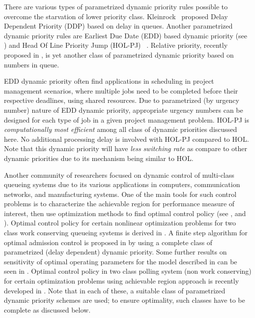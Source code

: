 \documentclass[letterpaper, 10 pt, conference]{ieeeconf}  %
\begin{document}
There are various types of parametrized dynamic priority rules possible to overcome the starvation of lower priority class. Kleinrock~\cite{Kleinrock1964} proposed Delay Dependent Priority (DDP) based on delay in queues. Another parametrized dynamic priority rules are Earliest Due Date (EDD) based dynamic priority (see \cite{EDDpriority}) and Head Of Line Priority Jump (HOL-PJ) ~\cite{holpj}. Relative priority, recently proposed in \cite{haviv2}, is yet another class of parametrized dynamic priority based on numbers in queue.

EDD dynamic priority often find applications in scheduling in project management scenarios, where multiple jobs need to be completed before their respective deadlines, using shared resources. Due to parametrized (by urgency number) nature of EDD dynamic priority, appropriate urgency numbers can be designed for each type of job in a given project management problem.
HOL-PJ is \textit{computationally most efficient} among all class of dynamic priorities discussed here. No additional processing delay is involved with HOL-PJ compared to HOL. Note that this dynamic priority will have \textit{less} \textit{switching rate} as compare to other dynamic priorities due to its mechanism being similar to HOL. 

Another community of researchers focused on dynamic control of multi-class queueing systems due to its various applications in computers, communication networks, and manufacturing systems. One of the main tools for such control problems is to characterize the achievable region for performance measure of interest, then use optimization methods to find optimal control policy (see \cite{bertsimas1995achievable}, \cite{bertsimas1996conservation} and \cite{li2012delay}).  Optimal control policy for certain nonlinear optimization problems for two class work conserving queueing systems is derived in \cite{hassin2009use}. A finite step algorithm for optimal admission control is proposed in \cite{sinha2010pricing} by using a complete class of parametrized (delay dependent) dynamic priority. Some further results on sensitivity of optimal operating parameters for the model described in \cite{sinha2010pricing} can be seen in \cite{ourwork}. Optimal control policy in two class polling system (non work conserving) for certain optimization problems using achievable region approach is recently developed  in \cite{2classpolling}. Note that in each of these, a suitable class of parametrized dynamic priority schemes are used; to ensure optimality, such classes have to be complete as discussed below. 
\end{document}
